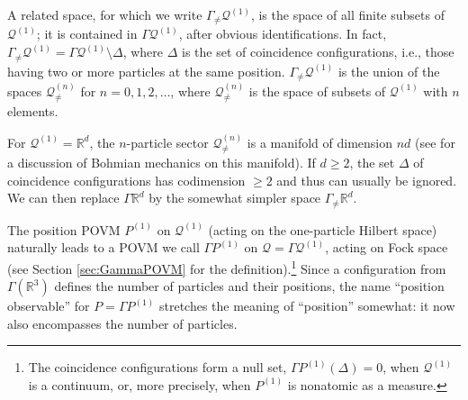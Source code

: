 \documentclass[12pt]{article}
\newcommand{\RRR}{\mathbb{R}} %
\newcommand{\1}{\mathbf{1}} %
\newcommand{\conf}{\mathcal{Q}} %
\newcommand{\pov}{{P}}%
\newcommand{\Gommo}{\Gamma_{\!\neq}} %
\begin{document}
A related space, for which we write $\Gommo \conf^{(1)}$, is the space
of all finite subsets of $\conf^{(1)}$; it is contained in $\Gamma
\conf^{(1)}$, after obvious identifications. In fact, $\Gommo
\conf^{(1)} = \Gamma \conf^{(1)} \setminus \Delta$, where $\Delta$ is
the set of coincidence configurations, i.e., those having two or more
particles at the same position.  $\Gommo \conf^{(1)}$ is the union of
the spaces ${\conf}^{(n)}_{\neq}$ for $n=0,1,2, \ldots$, where
${\conf}^{(n)}_{\neq}$ is the space of subsets of $\conf^{(1)}$ with
$n$ elements.

For $\conf^{(1)} = \RRR^d$, the $n$-particle sector
${\conf}^{(n)}_{\neq}$ is a manifold of dimension $nd$ (see
\cite{identical} for a discussion of Bohmian mechanics on this
manifold).  If $d\geq 2$, the set $\Delta$ of coincidence
configurations has codimension $\geq 2$ and thus can usually be
ignored.  We can then replace $\Gamma \RRR^d$ by the somewhat simpler
space $\Gommo \RRR^d$.

The position POVM $\pov^{(1)}$ on $\conf^{(1)}$ (acting on the
one-particle Hilbert space) naturally leads to a POVM we call $\Gamma
\pov^{(1)}$ on $\conf = \Gamma \conf^{(1)}$, acting on Fock space (see
Section \ref{sec:GammaPOVM} for the definition).\footnote{The
coincidence configurations form a null set, $\Gamma \pov^{(1)}(\Delta)
=0$, when $\conf^{(1)}$ is a continuum, or, more precisely, when
$\pov^{(1)}$ is nonatomic as a measure.}  Since a configuration from
$\Gamma(\RRR^3)$ defines the number of particles and their positions,
the name ``position observable'' for $\pov = \Gamma \pov^{(1)}$
stretches the meaning of ``position'' somewhat: it now also
encompasses the number of particles.
\end{document}
